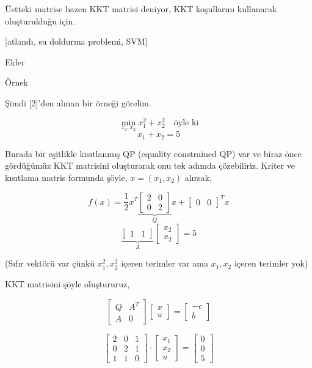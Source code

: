 \documentclass[12pt,fleqn]{article}\usepackage{../../common}
\begin{document}
Üstteki matrise bazen KKT matrisi deniyor, KKT koşullarını kullanarak
oluşturulduğu için. 

[atlandı, su doldurma problemi, SVM]

Ekler

Örnek

Şimdi [2]'den alınan bir örneği görelim. 

$$
\min_{x_1,x_2} x_1^2 + x_2^2 \quad \textrm{öyle ki}
$$
$$
x_1 + x_2 = 5
$$

Burada bir eşitlikle kısıtlanmış QP (equality constrained QP) var ve biraz
önce gördüğümüz KKT matrisini oluşturarak onu tek adımda çözebiliriz. 
Kriter ve kısıtlama matris formunda şöyle, $x = (x_1,x_2)$ alırsak,

$$
f(x) = \frac{1}{2} x^T 
\underbrace{
\left[\begin{array}{cc}
2 & 0 \\ 0 & 2
\end{array}\right]}_{Q} x + 
\left[\begin{array}{cc}
0 & 0
\end{array}\right]^T x
$$
$$
\underbrace{
\left[\begin{array}{cc}
1 & 1
\end{array}\right]}_{A}
\left[\begin{array}{c}
x_2 \\ x_2
\end{array}\right] = 5
$$

(Sıfır vektörü var çünkü $x_1^2,x_2^2$ içeren terimler var ama $x_1,x_2$
içeren terimler yok)

KKT matrisini şöyle oluştururuz, 

$$
\left[\begin{array}{ccc}
Q & A^T \\ A & 0
\end{array}\right]
\left[\begin{array}{c}
x \\ u
\end{array}\right] =
\left[\begin{array}{r}
-c \\ b
\end{array}\right] 
$$

$$
\left[\begin{array}{ccc}
2 & 0 & 1 \\
0 & 2 & 1 \\
1 & 1 & 0
\end{array}\right]
\cdot
\left[\begin{array}{c}
x_1 \\ x_2 \\ u
\end{array}\right] = 
\left[\begin{array}{c}
0 \\ 0 \\ 5
\end{array}\right] 
$$
\end{document}
